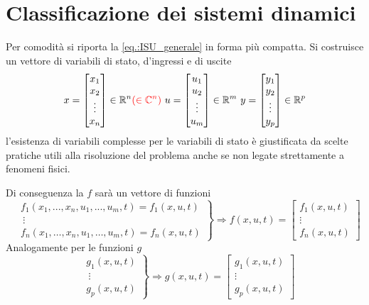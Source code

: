\section{Classificazione dei sistemi dinamici}
Per comodità si riporta la \ref{eq.:ISU_generale} in forma più compatta.
Si costruisce un vettore di variabili di stato, d'ingressi e di uscite
$$
x = \begin{bmatrix}
x_1\\
x_2\\
\vdots\\
x_n
\end{bmatrix} \in \mathbb{R}^n \textcolor{red}{\left(\in\mathbb{C}^n\right)}\
u=\begin{bmatrix}
u_1\\
u_2\\
\vdots\\
u_m
\end{bmatrix}\in\mathbb{R}^m\
y=\begin{bmatrix}
y_1\\
y_2\\
\vdots\\
y_p
\end{bmatrix}\in \mathbb{R}^p
$$
l'esistenza di variabili complesse per le variabili di stato è giustificata da scelte pratiche
utili alla risoluzione del problema anche se non legate strettamente a fenomeni fisici.

Di conseguenza la $f$ sarà un vettore di funzioni
$$\left.\begin{aligned}
&f_1\left(x_1,...,x_n,u_1,...,u_m,t\right)=f_1(x,u,t)\\
&\ \vdots\\
&f_n\left(x_1,\ldots,x_n,u_1,\ldots,u_m,t\right)=f_n(x,u,t)
\end{aligned}\right\} \Rightarrow f(x,u,t)=\begin{bmatrix}
f_1(x,u,t)\\
\vdots\\
f_n(x,u,t)
\end{bmatrix}
$$
Analogamente per le funzioni $g$
$$
\left.\begin{aligned}
&g_1(x,u,t)\\
&\ \vdots\\
&g_p(x,u,t)
\end{aligned}\right\}\Rightarrow
g(x,u,t) = \begin{bmatrix}
g_1(x,u,t)\\
\vdots\\
g_p(x,u,t)
\end{bmatrix}
$$

